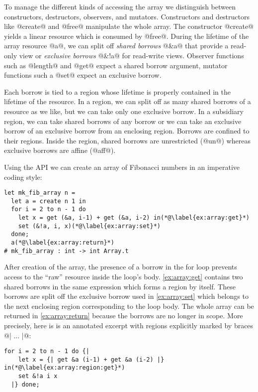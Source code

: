 To manage the different kinds of accessing the array we distinguish between constructors, destructors,
observers, and mutators.
Constructors and destructors like @create@ and @free@ manipulate the whole
array. %
The constructor
@create@ yields a linear resource which is consumed by @free@.
During the lifetime of the array resource @a@, we can split
off \emph{shared borrows} @&a@ that provide a read-only
view or \emph{exclusive borrows} @&!a@ for read-write views.
Observer functions such as @length@ and @get@ expect a shared borrow
argument, mutator functions such a @set@ expect
an exclusive borrow.

Each borrow is tied to a region whose lifetime is properly
contained in the lifetime of the resource.
In a region, we can split off as many shared borrows of a resource as
we like, but we can take only one exclusive borrow. In a
subsidiary region, we can take shared borrows of any
borrow or we can take an exclusive borrow of an exclusive borrow from an
enclosing region. Borrows are confined to their regions. Inside the region,
shared borrows are unrestricted (@un@) whereas exclusive
borrows are affine (@aff@).

Using the API 
we can create an
array of Fibonacci numbers in an imperative coding style:
\begin{lstlisting}
let mk_fib_array n =
  let a = create n 1 in
  for i = 2 to n - 1 do
    let x = get (&a, i-1) + get (&a, i-2) in(*@\label{ex:array:get}*)
    set (&!a, i, x)(*@\label{ex:array:set}*)
  done;
  a(*@\label{ex:array:return}*)
# mk_fib_array : int -> int Array.t
\end{lstlisting}

After
creation of the array, the presence of a borrow in the for loop
prevents access to the ``raw'' resource inside the loop's
body. \cref{ex:array:get} contains two shared borrows
in the same expression which forms a region by itself. These borrows
are split off the exclusive borrow used in \cref{ex:array:set} which
belongs to the next enclosing region corresponding to the loop body.
The whole array can be returned in \cref{ex:array:return} because  the
borrows are no longer in scope.
%
More precisely, here is is an annotated excerpt with regions explicitly
marked by braces @{| ... |}@:
\begin{lstlisting}[firstnumber=3]
  for i = 2 to n - 1 do {|
    let x = {| get &a (i-1) + get &a (i-2) |} in(*@\label{ex:array:region:get}*)
    set &!a i x
  |} done;
\end{lstlisting}

